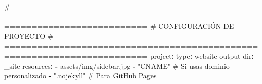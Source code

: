 \documentclass[
  doc,
  floatsintext,
  longtable,
  a4paper,
  nolmodern,
  notxfonts,
  notimes,
  12pt,
  colorlinks=true,linkcolor=blue,citecolor=blue,urlcolor=blue]{apa7}
\newenvironment{Shaded}{\begin{snugshade}}{\end{snugshade}}
\newcommand{\AttributeTok}[1]{\textcolor[rgb]{0.40,0.45,0.13}{#1}}
\newcommand{\CommentTok}[1]{\textcolor[rgb]{0.37,0.37,0.37}{#1}}
\newcommand{\FunctionTok}[1]{\textcolor[rgb]{0.28,0.35,0.67}{#1}}
\newcommand{\KeywordTok}[1]{\textcolor[rgb]{0.00,0.23,0.31}{\textbf{#1}}}
\newcommand{\StringTok}[1]{\textcolor[rgb]{0.13,0.47,0.30}{#1}}
\begin{document}
\begin{Shaded}
\begin{Highlighting}[]
\CommentTok{\# ========================================================================}
\CommentTok{\# CONFIGURACIÓN DE PROYECTO}
\CommentTok{\# ========================================================================}
\FunctionTok{project}\KeywordTok{:}
\AttributeTok{  }\FunctionTok{type}\KeywordTok{:}\AttributeTok{ website}
\AttributeTok{  }\FunctionTok{output{-}dir}\KeywordTok{:}\AttributeTok{ \_site}
\AttributeTok{  }\FunctionTok{resources}\KeywordTok{:}
\AttributeTok{    }\KeywordTok{{-}}\AttributeTok{ assets/img/sidebar.jpg}
\AttributeTok{    }\KeywordTok{{-}}\AttributeTok{ }\StringTok{"CNAME"}\CommentTok{                        \# Si usas dominio personalizado}
\AttributeTok{    }\KeywordTok{{-}}\AttributeTok{ }\StringTok{".nojekyll"}\CommentTok{                    \# Para GitHub Pages}


\end{Highlighting}
\end{Shaded}
\end{document}
